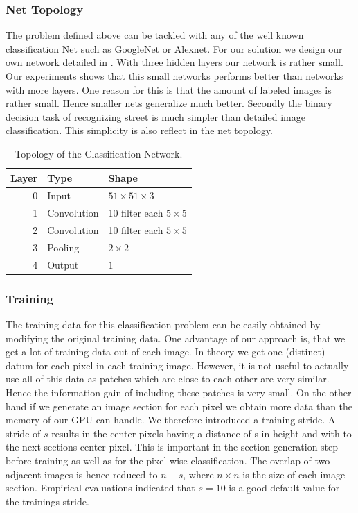 \subsubsection{Net Topology}
The problem defined above can be tackled with any of the well known
classification Net such as GoogleNet or Alexnet. For our solution we design our
own network detailed in . With three hidden layers our network
is rather small. Our experiments shows that this small networks performs better
than networks with more layers. One reason for this is that the amount of
labeled images is rather small. Hence smaller nets generalize much better.
Secondly the binary decision task of recognizing street is much simpler than
detailed image classification. This simplicity is also reflect in the net
topology.

\begin{table}[H]
	\normalsize
	\centering
\begin{tabular}{r  l l}
	\toprule
	\textbf{Layer} & \textbf{Type}  & \textbf{Shape}  \\
	\midrule
	0     & Input &  $51 \times 51 \times 3$ \\
	1     & Convolution & 10 filter  each $5 \times 5$ \\
	2     & Convolution & 10 filter  each $5 \times 5$  \\
	3     & Pooling     & $2 \times 2$ \\
	4     & Output     & $1$ \\
	\bottomrule
\end{tabular}
\caption{Topology of the Classification Network.}
\label{tab:topo}
\end{table}

\subsubsection{Training}

The training data for this classification problem can be easily obtained by modifying the original training data. One advantage of our approach is, that we get a lot of training data out of each image. In theory we get one (distinct) datum for each pixel in each training image. However, it is not useful to actually use all of this data as patches which are close to each other are very similar. Hence the information gain of including these patches is very small. On the other hand if we generate an image section for each pixel we obtain more data than the memory of our GPU can handle. We therefore introduced a training stride. A stride of $s$ results in the center pixels having a distance of s in height and with to the next sections center pixel. This is important in the section generation step before training as well as for the pixel-wise classification. The overlap of two adjacent images is hence reduced to $n-s$, where $n \times n$ is the size of each image section. Empirical evaluations indicated that $s=10$ is a good default value for the trainings stride.



